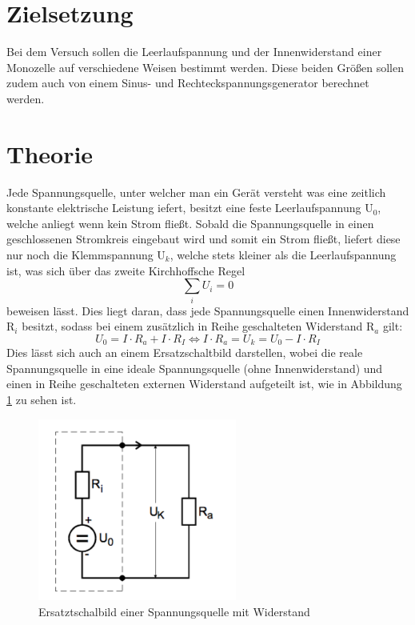 \section{Zielsetzung}
Bei dem Versuch sollen die Leerlaufspannung und der Innenwiderstand einer Monozelle
auf verschiedene Weisen bestimmt werden. Diese beiden Größen sollen zudem auch von
einem Sinus- und Rechteckspannungsgenerator berechnet werden.

\section{Theorie}
Jede Spannungsquelle, unter welcher man ein Gerät versteht was eine zeitlich konstante
elektrische Leistung iefert, besitzt eine feste Leerlaufspannung $\text{U}_0$, welche
anliegt wenn kein Strom fließt. Sobald die Spannungsquelle in einen geschlossenen
Stromkreis eingebaut wird und somit ein Strom fließt,
liefert diese nur noch die Klemmspannung $\text{U}_k$, welche stets kleiner als
die Leerlaufspannung ist, was sich über das zweite Kirchhoffsche Regel
\begin{equation}
  \sum_i U_i = 0
\end{equation}
beweisen lässt. Dies liegt daran, dass jede Spannungsquelle einen Innenwiderstand
$\text{R}_i$ besitzt, sodass bei einem zusätzlich in Reihe geschalteten Widerstand
$\text{R}_a$ gilt:
\begin{equation}
  U_0 = I\cdot R_a + I\cdot R_I \iff I\cdot R_a = U_k = U_0 - I\cdot R_I
  \label{eqn:formel}
\end{equation}
Dies lässt sich auch an einem Ersatzschaltbild darstellen, wobei die reale
Spannungsquelle in eine ideale Spannungsquelle (ohne Innenwiderstand) und einen
in Reihe geschalteten externen Widerstand aufgeteilt ist, wie in Abbildung
\ref{fig:schalt1} zu sehen ist.
\begin{figure}[H]
  \centering
  \includegraphics[height=6cm]{schalt1.png}
  \caption{Ersatztschalbild einer Spannungsquelle mit Widerstand \cite{skript}}
  \label{fig:schalt1}
\end{figure}
